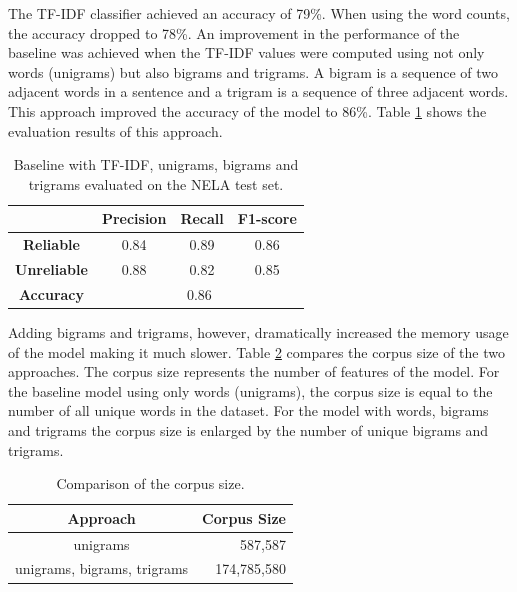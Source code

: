 The TF-IDF classifier achieved an accuracy of 79\%. When using the word counts, the accuracy dropped to 78\%. An improvement in the performance of the baseline was achieved when the TF-IDF values were computed using not only words (unigrams) but also bigrams and trigrams. A bigram is a sequence of two adjacent words in a sentence and a trigram is a sequence of three adjacent words. This approach improved the accuracy of the model to 86\%. Table \ref{tab:baseline_trigrams} shows the evaluation results of this approach.


\begin{table}[H]
    \centering
\begin{tabular}{c|ccc|}
\cline{2-4}
 & \multicolumn{1}{c|}{\textbf{Precision}} & \multicolumn{1}{c|}{\textbf{Recall}} & \textbf{F1-score} \\ \hline
\multicolumn{1}{|c|}{\textbf{Reliable}} & \multicolumn{1}{c|}{0.84} & \multicolumn{1}{c|}{0.89} & 0.86 \\ \hline
\multicolumn{1}{|c|}{\textbf{Unreliable}} & \multicolumn{1}{c|}{0.88} & \multicolumn{1}{c|}{0.82} & 0.85 \\ \hline
\multicolumn{1}{|c|}{\textbf{Accuracy}} & \multicolumn{3}{c|}{0.86} \\ \hline
\end{tabular}
    \caption{Baseline with TF-IDF, unigrams, bigrams and trigrams evaluated on the NELA test set.}
    \label{tab:baseline_trigrams}
\end{table}


Adding bigrams and trigrams, however, dramatically increased the memory usage of the model making it much slower. Table \ref{tab:mem_comp} compares the corpus size of the two approaches. The corpus size represents the number of features of the model. For the baseline model using only words (unigrams), the corpus size is equal to the number of all unique words in the dataset. For the model with words, bigrams and trigrams the corpus size is enlarged by the number of unique bigrams and trigrams.

\begin{table}[H]
    \centering
\begin{tabular}{|c|r|}
\hline
\textbf{Approach}           & \textbf{Corpus Size}  \\ \hline
unigrams                    & 587,587                             \\ \hline
unigrams, bigrams, trigrams & 174,785,580                         \\ \hline
\end{tabular}
    \caption{Comparison of the corpus size.}
    \label{tab:mem_comp}
\end{table}

